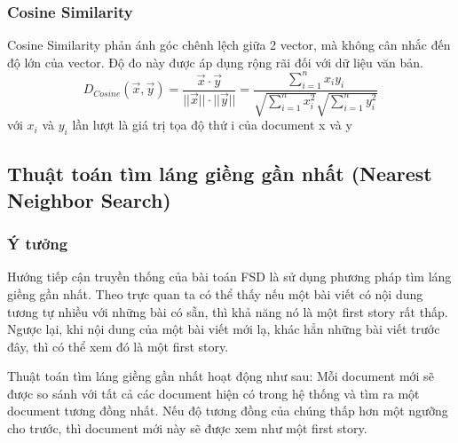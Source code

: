	\subsubsection*{Cosine Similarity}
	Cosine Similarity phản ánh góc chênh lệch giữa 2 vector, mà không cân nhắc đến độ lớn của vector. Độ đo này được áp dụng rộng rãi đối với dữ liệu văn bản.
	\begin{equation}
		D_{Cosine}(\vec{x}, \vec{y}) = \frac {\vec{x} \cdot \vec{y}}{||\vec{x}|| \cdot ||\vec{y}||} = \frac{\sum_{i=1}^{n}x_iy_i}{\sqrt{\sum_{i=1}^{n}x_i^2} \sqrt{\sum_{i=1}^{n}y_i^2}}	
	\end{equation}
	với  $x_i$ và $y_i$ lần lượt là giá trị tọa độ thứ i của document x và y
	
\subsection{Thuật toán tìm láng giềng gần nhất (Nearest Neighbor Search)}
	\subsubsection{Ý tưởng}
	Hướng tiếp cận truyền thống của bài toán FSD là sử dụng phương pháp tìm láng giềng gần nhất. Theo trực quan ta có thể thấy nếu một bài viết có nội dung tương tự nhiều với những bài có sẵn, thì khả năng nó là một first story rất thấp. Ngược lại, khi nội dung của một bài viết mới lạ, khác hẳn những bài viết trước đây, thì có thể xem đó là một first story. 
	
	Thuật toán tìm láng giềng gần nhất hoạt động như sau: Mỗi document mới sẽ được so sánh với tất cả các document hiện có trong hệ thống và tìm ra một document tương đồng nhất. Nếu độ tương đồng của chúng thấp hơn một ngưỡng cho trước, thì document mới này sẽ được xem như một first story.\\
	
